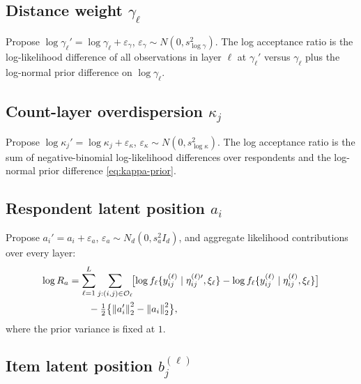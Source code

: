 \documentclass[11pt]{article}
\newcommand{\norm}[1]{\left\lVert #1 \right\rVert}
\begin{document}
\subsection{Distance weight $\gamma_\ell$}

Propose $\log\gamma_\ell'=\log\gamma_\ell+\varepsilon_\gamma$,
$\varepsilon_\gamma\sim N(0,s_{\log\gamma}^2)$.  The log acceptance ratio
is the log-likelihood difference of all observations in layer $\ell$ at
$\gamma_\ell'$ versus $\gamma_\ell$ plus the log-normal prior difference
on $\log\gamma_\ell$.

\subsection{Count-layer overdispersion $\kappa_j$}

Propose $\log\kappa_j'=\log\kappa_j+\varepsilon_\kappa$,
$\varepsilon_\kappa\sim N(0,s_{\log\kappa}^2)$.  The log acceptance ratio
is the sum of negative-binomial log-likelihood differences over
respondents and the log-normal prior difference \eqref{eq:kappa-prior}.

\subsection{Respondent latent position $a_i$}

Propose $a_i'=a_i+\varepsilon_a$, $\varepsilon_a\sim N_d(0,s_a^2 I_d)$,
and aggregate likelihood contributions over every layer:
\begin{align}
    \log R_a
    &=
    \sum_{\ell=1}^L\sum_{j:(i,j)\in\mathcal O_\ell}
    \!\bigl[\log f_\ell\{y_{ij}^{(\ell)}\mid\eta_{ij}^{(\ell)\prime},\xi_\ell\}
        -\log f_\ell\{y_{ij}^{(\ell)}\mid\eta_{ij}^{(\ell)},\xi_\ell\}\bigr]
    \notag\\
    &\qquad
    -\tfrac{1}{2}\bigl\{\norm{a_i'}_2^2-\norm{a_i}_2^2\bigr\},
    \label{eq:a-mh}
\end{align}
where the prior variance is fixed at $1$.

\subsection{Item latent position $b_j^{(\ell)}$}
\label{subsec:b-mh}
\end{document}
